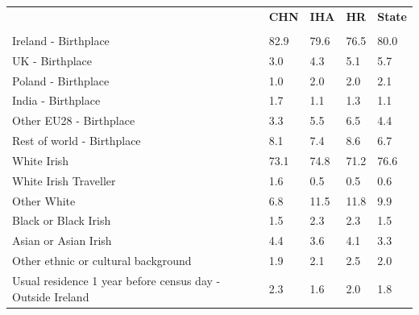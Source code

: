 \documentclass{article}
\begin{document}
\pagebreak
\begin{table}[h]	
\centering
		\begin{tabular}{KTTTT}
  \hline
& \textbf{CHN} & \textbf{IHA} & \textbf{HR}& \textbf{State}\\ 
  \hline
    \\ 
    \hline
Ireland - Birthplace & 82.9& 79.6& 76.5& 80.0\\
UK - Birthplace & 3.0& 4.3& 5.1& 5.7\\
Poland - Birthplace & 1.0& 2.0& 2.0& 2.1\\
India - Birthplace & 1.7& 1.1& 1.3& 1.1\\
Other EU28 - Birthplace & 3.3& 5.5& 6.5& 4.4\\
Rest of world - Birthplace & 8.1& 7.4& 8.6& 6.7\\
    \hline
White Irish & 73.1& 74.8& 71.2& 76.6\\
White Irish Traveller & 1.6& 0.5& 0.5& 0.6\\
Other White &  6.8& 11.5& 11.8&  9.9\\
Black or Black Irish & 1.5& 2.3& 2.3& 1.5\\
Asian or Asian Irish & 4.4& 3.6& 4.1& 3.3\\
Other ethnic or cultural background & 1.9& 2.1& 2.5& 2.0\\
    \hline
Usual residence 1 year before census day - Outside Ireland & 2.3& 1.6& 2.0& 1.8\\


\end{tabular}
\end{table}
\end{document}
